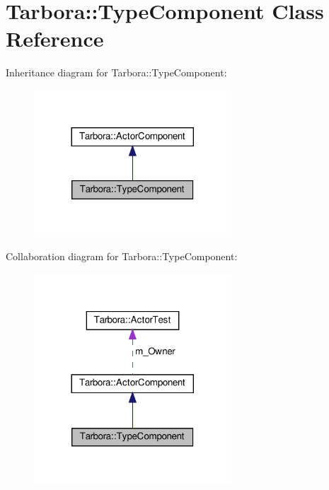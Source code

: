 \hypertarget{classTarbora_1_1TypeComponent}{}\section{Tarbora\+:\+:Type\+Component Class Reference}
\label{classTarbora_1_1TypeComponent}


Inheritance diagram for Tarbora\+:\+:Type\+Component\+:\nopagebreak
\begin{figure}[H]
\begin{center}
\leavevmode
\includegraphics[width=209pt]{classTarbora_1_1TypeComponent__inherit__graph}
\end{center}
\end{figure}


Collaboration diagram for Tarbora\+:\+:Type\+Component\+:\nopagebreak
\begin{figure}[H]
\begin{center}
\leavevmode
\includegraphics[width=209pt]{classTarbora_1_1TypeComponent__coll__graph}
\end{center}
\end{figure}
